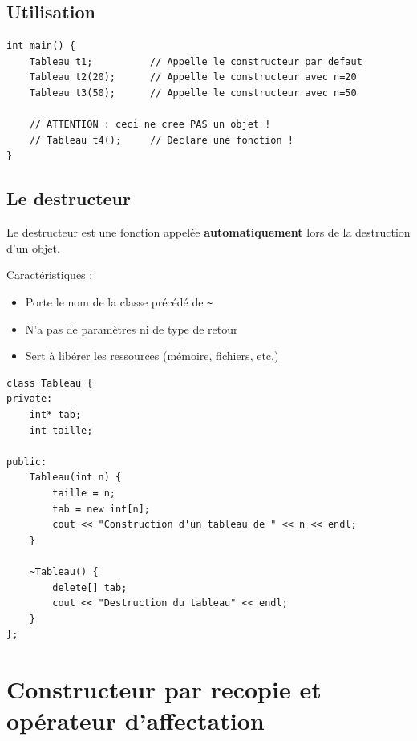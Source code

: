 \documentclass[12pt,a4paper]{article}
\begin{document}
\subsection{Utilisation}

\begin{lstlisting}[style=cpp, caption={Appel des constructeurs}]
int main() {
    Tableau t1;          // Appelle le constructeur par defaut
    Tableau t2(20);      // Appelle le constructeur avec n=20
    Tableau t3(50);      // Appelle le constructeur avec n=50

    // ATTENTION : ceci ne cree PAS un objet !
    // Tableau t4();     // Declare une fonction !
}
\end{lstlisting}

\subsection{Le destructeur}

Le destructeur est une fonction appelée \textbf{automatiquement} lors de la destruction d'un objet.

\begin{regle}
Caractéristiques :
\begin{itemize}
    \item Porte le nom de la classe précédé de \texttt{\~{}}
    \item N'a pas de paramètres ni de type de retour
    \item Sert à libérer les ressources (mémoire, fichiers, etc.)
\end{itemize}
\end{regle}

\begin{lstlisting}[style=cpp, caption={Destructeur}]
class Tableau {
private:
    int* tab;
    int taille;

public:
    Tableau(int n) {
        taille = n;
        tab = new int[n];
        cout << "Construction d'un tableau de " << n << endl;
    }

    ~Tableau() {
        delete[] tab;
        cout << "Destruction du tableau" << endl;
    }
};
\end{lstlisting}

\section{Constructeur par recopie et opérateur d'affectation}
\end{document}
